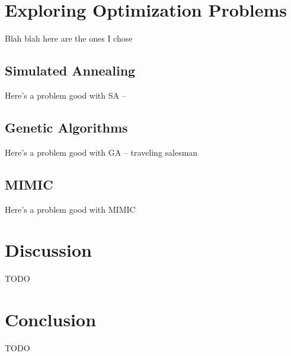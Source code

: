 \documentclass{article}
\begin{document}
  \section{Exploring Optimization Problems}
    Blah blah here are the ones I chose

    \subsection{Simulated Annealing}
      Here's a problem good with SA -- 

    \subsection{Genetic Algorithms}
      Here's a problem good with GA -- traveling salesman

    \subsection{MIMIC}
      Here's a problem good with MIMIC

  \section{Discussion}
    TODO

  \section{Conclusion}
    TODO
\end{document}
